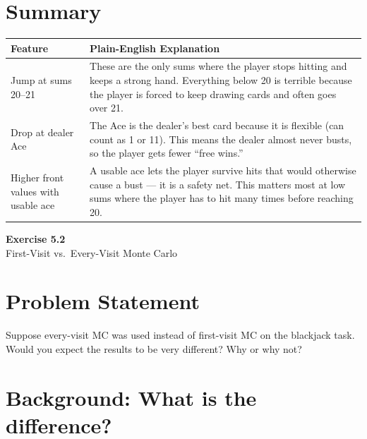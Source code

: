 \documentclass[11pt]{article}
\begin{document}
\section*{Summary}

\begin{table}[ht]
    \centering
    \begin{tabular}{p{} p{}}
        \toprule
        \textbf{Feature} & \textbf{Plain-English Explanation} \\
        \midrule
        Jump at sums 20--21 & These are the only sums where the player stops hitting and keeps a strong hand. Everything below 20 is terrible because the player is forced to keep drawing cards and often goes over 21. \\
        \addlinespace
        Drop at dealer Ace & The Ace is the dealer's best card because it is flexible (can count as 1 or 11). This means the dealer almost never busts, so the player gets fewer ``free wins.'' \\
        \addlinespace
        Higher front values with usable ace & A usable ace lets the player survive hits that would otherwise cause a bust --- it is a safety net. This matters most at low sums where the player has to hit many times before reaching 20. \\
        \bottomrule
    \end{tabular}
\end{table}

\newpage

\begin{center}
    {\Large\color{garnet}\textbf{Exercise 5.2}}\\[6pt]
    {\large First-Visit vs.\ Every-Visit Monte Carlo}
\end{center}

\section*{Problem Statement}

Suppose every-visit MC was used instead of first-visit MC on the blackjack task. Would you expect the results to be very different? Why or why not?

\section*{Background: What is the difference?}
\end{document}
